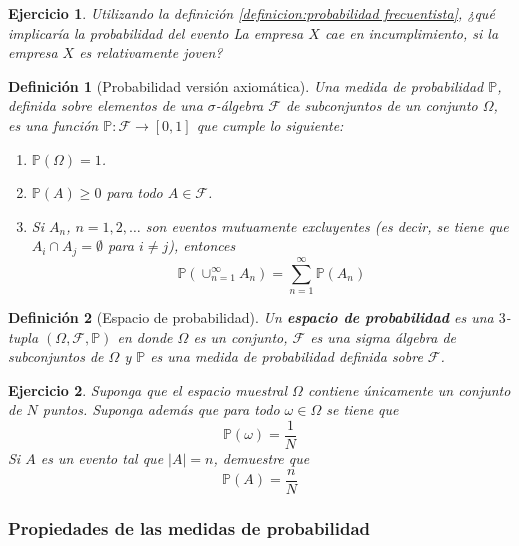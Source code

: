 \documentclass[11pt]{report}
\theoremstyle{break}
\newtheorem{definicion}{Definición}[chapter]
\newtheorem{ejercicio}{Ejercicio}[chapter]
\theoremstyle{break}
\begin{document}
\begin{ejercicio}
Utilizando la definición \ref{definicion:probabilidad frecuentista}, ¿qué implicaría la probabilidad del evento \textit{La empresa $X$ cae en incumplimiento}, si la empresa $X$ es relativamente joven?
\end{ejercicio}

\begin{definicion}[Probabilidad versión axiomática]
Una medida de probabilidad $\mathbb{P}$, definida sobre elementos de una $\sigma$-álgebra $\mathcal{F}$ de subconjuntos de un conjunto $\Omega$, es una función $\mathbb{P}:\mathcal{F} \rightarrow [0,1]$ que cumple lo siguiente:

\begin{enumerate}
\item $\mathbb{P}(\Omega) = 1$.
\item $\mathbb{P}(A) \geq 0$ para todo $A \in \mathcal{F}$.
\item Si $A_n$, $n=1,2,\ldots$ son eventos mutuamente excluyentes (es decir, se tiene que  $A_i \cap A_j = \emptyset$ para $i \neq j$), entonces 
$$
\mathbb{P}\left(\cup_{n=1}^{\infty}A_n \right) = \sum_{n=1}^{\infty}\mathbb{P}(A_n)
$$
\end{enumerate}
\end{definicion}

\begin{definicion}[Espacio de probabilidad]
\label{definicion:espacio de probabilidad}
Un \textbf{espacio de probabilidad} es una $3$-tupla $\left( \Omega, \mathcal{F}, \mathbb{P} \right)$ en donde $\Omega$ es un conjunto, $\mathcal{F}$ es una sigma álgebra de subconjuntos de $\Omega$ y $\mathbb{P}$ es una medida de probabilidad definida sobre $\mathcal{F}$.
\end{definicion}

\begin{ejercicio}
Suponga que el espacio muestral $\Omega$ contiene únicamente un conjunto de $N$ puntos. Suponga además que para todo $\omega \in \Omega$ se tiene que
$$
\mathbb{P}(\omega) = \dfrac{1}{N}
$$
Si $A$ es un evento tal que $|A| = n$, demuestre que
$$
\mathbb{P}(A) = \dfrac{n}{N}
$$
\end{ejercicio}

\subsubsection{Propiedades de las medidas de probabilidad}
\end{document}
